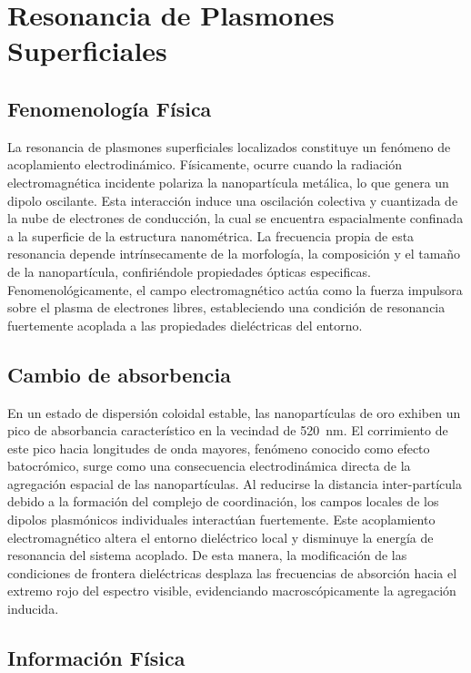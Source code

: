 \section{Resonancia de Plasmones Superficiales}

\subsection{Fenomenología Física}

La resonancia de plasmones superficiales localizados constituye un fenómeno de
acoplamiento electrodinámico. Físicamente, ocurre cuando la radiación
electromagnética incidente polariza la nanopartícula metálica, lo que genera un
dipolo oscilante. Esta interacción induce una oscilación colectiva y cuantizada
de la nube de electrones de conducción, la cual se encuentra espacialmente
confinada a la superficie de la estructura nanométrica. La frecuencia propia de
esta resonancia depende intrínsecamente de la morfología, la composición y el
tamaño de la nanopartícula, confiriéndole propiedades ópticas especificas.
Fenomenológicamente, el campo electromagnético actúa como la fuerza
impulsora sobre el plasma de electrones libres, estableciendo una condición de
resonancia fuertemente acoplada a las propiedades dieléctricas del entorno.

\subsection{Cambio de absorbencia}

En un estado de dispersión coloidal estable, las nanopartículas de oro exhiben
un pico de absorbancia característico en la vecindad de \qty{520}{\nano\metre}.
El corrimiento de este pico hacia longitudes de onda mayores, fenómeno conocido
como efecto batocrómico, surge como una consecuencia electrodinámica directa de
la agregación espacial de las nanopartículas. Al reducirse la
distancia inter-partícula debido a la formación del complejo de coordinación,
los campos locales de los dipolos plasmónicos individuales interactúan
fuertemente. Este acoplamiento electromagnético altera
el entorno dieléctrico local y disminuye la energía de
resonancia del sistema acoplado. De esta manera, la modificación de
las condiciones de frontera dieléctricas desplaza las frecuencias de absorción
hacia el extremo rojo del espectro visible, evidenciando macroscópicamente la
agregación inducida.

\subsection{Información Física}

